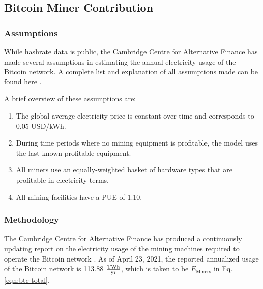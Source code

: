 \subsection{Bitcoin Miner Contribution}\label{sec:btc-miners}

\subsubsection{Assumptions}
While hashrate data is public, the Cambridge Centre for Alternative Finance has made several assumptions in estimating the annual electricity usage of the Bitcoin network.
A complete list and explanation of all assumptions made can be found \href{https://cbeci.org/cbeci/methodology}{here} \cite{btc-cbeci-meth}.

A brief overview of these assumptions are:
\begin{enumerate}
  \item The global average electricity price is constant over time and corresponds to 0.05 USD/kWh.
  \item During time periods where no mining equipment is profitable, the model uses the last known profitable equipment.
  \item All miners use an equally-weighted basket of hardware types that are profitable in electricity terms.
  \item All mining facilities have a PUE of 1.10.
\end{enumerate}

\subsubsection{Methodology}
The Cambridge Centre for Alternative Finance has produced a continuously updating report on the electricity usage of the mining machines required to operate the Bitcoin network \cite{btc-cbeci}.
As of April 23, 2021, the reported annualized usage of the Bitcoin network is 113.88 $\tfrac{ \textrm{{T}Wh} } { \textrm{yr} }$, which is taken to be $E_\textrm{Miners}$ in Eq. \eqref{eqn:btc-total}.
